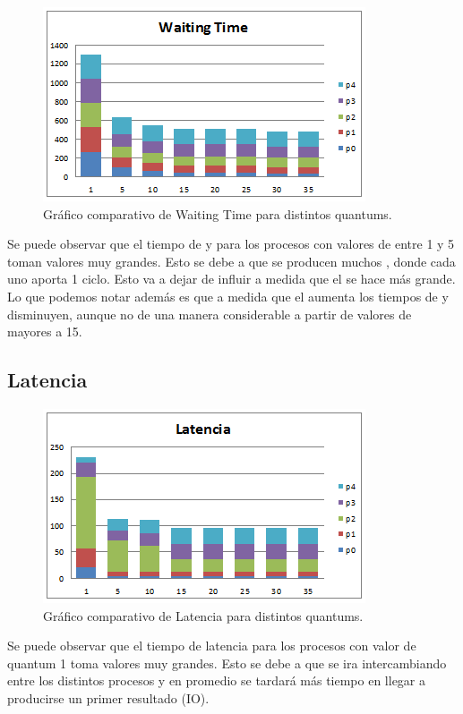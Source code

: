 \begin{figure}[H]
  \centering
    \includegraphics{img/waitingTime.png}
    \caption{Gr\'afico comparativo de Waiting Time para distintos quantums.}
\end{figure}

Se puede observar que el tiempo de \ta y \wt para los procesos con valores de \quantum entre 1 y 5 toman valores muy grandes. Esto se debe a que se producen muchos \cs, donde cada uno aporta 1 ciclo. Esto va a dejar de influir a medida que el \quantum se hace m\'as grande.
Lo que podemos notar adem\'as es que a medida que el \quantum aumenta los tiempos de \ta y \wt disminuyen, aunque no de una manera considerable a partir de valores de \quantum mayores a 15.

\subsection{Latencia}

\begin{figure}[H]
  \centering
    \includegraphics{img/latencia.png}
    \caption{Gr\'afico comparativo de Latencia para distintos quantums.}
\end{figure}

Se puede observar que el tiempo de latencia para los procesos con valor de quantum 1 toma valores muy grandes. Esto se debe a que se ira intercambiando entre los distintos procesos y en promedio se tardar\'a m\'as tiempo en llegar a producirse un primer resultado (IO). 


